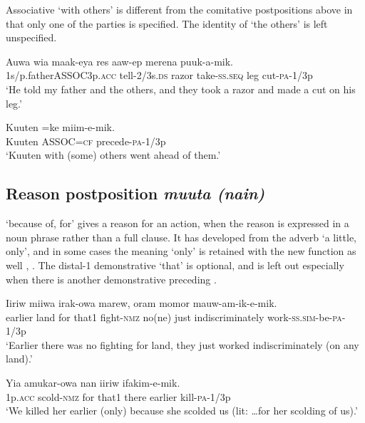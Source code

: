 Associative  `with others' is different from the comitative postpositions above in that only one of the parties is specified. The identity of `the others' is left unspecified.

\ea%
\label{ex:3:x826}
\gll Auwa  wia maak-eya res aaw-ep merena puuk-a-mik.\\
1s/p.father\textsc{ASSOC}3p.\textsc{acc} tell-2/3s.\textsc{ds} razor take-\textsc{ss}.\textsc{seq} leg cut-\textsc{pa}-1/3p\\
\glt`He told my father and the others, and they took a razor and made a cut on his leg.'
\z

\ea%
\label{ex:3:x827}
\gll Kuuten =ke miim-e-mik. \\
Kuuten ASSOC=\textsc{cf} precede-\textsc{pa}-1/3p\\
\glt`Kuuten with (some) others went ahead of them.'
\z

\subsection{Reason postposition \textit{muuta (nain)}}\label{sec:3:y:x}
{}
 `because of, for' gives a reason for an action, when the reason is expressed in a noun phrase rather than a full clause. It has developed from the adverb  `a little, only', and in some cases the meaning `only' is retained with the new function as well , . The distal-1 demonstrative  `that' is optional, and is left out especially when there is another demonstrative  preceding  .

\ea%
\label{ex:3:x756}
\gll Iiriw miiwa   irak-owa marew, oram momor mauw-am-ik-e-mik.\\
earlier land for that1 fight-\textsc{nmz} no(ne) just indiscriminately work-\textsc{ss}.\textsc{sim}-be-\textsc{pa}-1/3p\\
\glt`Earlier there was no fighting for land, they just worked indiscriminately (on any land).'
\z

\ea%
\label{ex:3:x1876}
\gll Yia amukar-owa   nan iiriw ifakim-e-mik. \\
1p.\textsc{acc} scold-\textsc{nmz} for that1 there earlier kill-\textsc{pa}-1/3p\\
\glt`We killed her earlier (only) because she scolded us (lit: {\dots}for her scolding of us).'
\z

